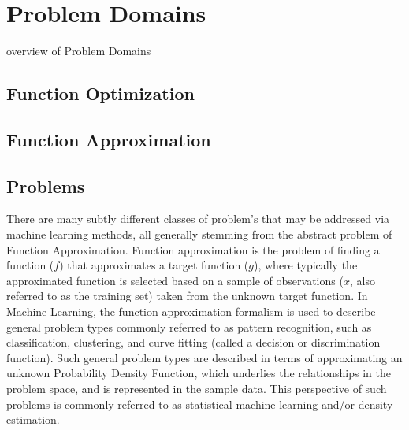 
\section{Problem Domains} 
\label{intro:problemdomains}

overview of Problem Domains

\subsection{Function Optimization}



\subsection{Function Approximation}


\subsection{Problems}
\label{subsec:problems}
There are many subtly different classes of problem's that may be addressed via machine learning methods, all generally stemming from the abstract problem of Function Approximation. Function approximation is the problem of finding a function ($f$) that approximates a target function ($g$), where typically the approximated function is selected based on a sample of observations ($x$, also referred to as the training set) taken from the unknown target function.
In Machine Learning, the function approximation formalism is used to describe general problem types commonly referred to as pattern recognition, such as classification, clustering, and curve fitting (called a decision or discrimination function). Such general problem types are described in terms of approximating an unknown Probability Density Function, which underlies the relationships in the problem space, and is represented in the sample data. This perspective of such problems is commonly referred to as statistical machine learning and/or density estimation.

